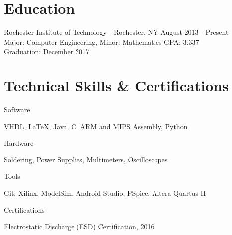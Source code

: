 \documentclass[a4paper,margin,line]{resume}
\newcommand{\rdate}[1]{\hfill {\small #1}}
\begin{document}
\begin{resume}
\section{\mysidestyle Education}
    \begin{compactdesc}
        \item[Rochester Institute of Technology] - Rochester, NY \rdate{August 2013 - Present} \\
            Major: Computer Engineering, Minor: Mathematics \rdate{GPA: 3.337} \\
            Graduation: December 2017
    \end{compactdesc}

\section{\mysidestyle Technical Skills \& Certifications}
    \begin{compactdesc}
        \item[Software] \begin{inparaenum} { \small
            VHDL,
            \LaTeX,
            Java,
            C,
            ARM and MIPS Assembly,
            Python
        } \end{inparaenum}
        \item[Hardware] \begin{inparaenum} { \small
            Soldering,
            Power Supplies,
            Multimeters,
            Oscilloscopes
        } \end{inparaenum}
        \item[Tools] \begin{inparaenum} { \small
            Git,
            Xilinx,
            ModelSim,
            Android Studio,
            PSpice,
            Altera Quartus II
        } \end{inparaenum}
        \item[Certifications] \begin{inparaenum} { \small
            Electrostatic Discharge (ESD) Certification, 2016   
        } \end{inparaenum}
    \end{compactdesc}


\end{resume}
\end{document}

